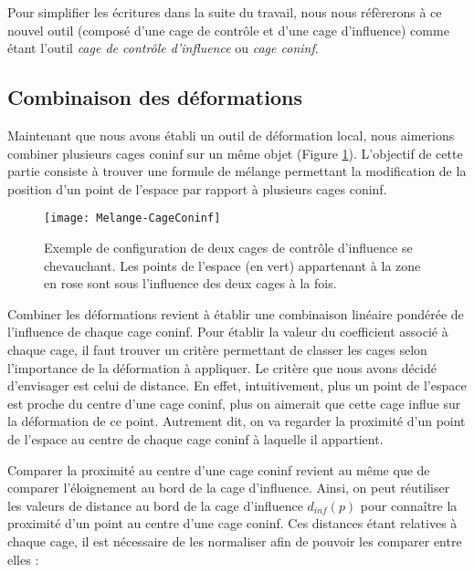 Pour simplifier les écritures dans la suite du travail, nous nous réfèrerons à
ce nouvel outil (composé d'une cage de contrôle et d'une cage d'influence)
comme étant l'outil \textit{cage de contrôle d'influence} ou \textit{cage
coninf}.

\subsection{Combinaison des déformations}

Maintenant que nous avons établi un outil de déformation local, nous aimerions
combiner plusieurs cages coninf sur un même objet (Figure \ref{MELMC}).
L'objectif de cette partie consiste à trouver une formule de mélange
permettant la modification de la position d'un point de l'espace par rapport à
plusieurs cages coninf.

\begin{figure}[ht]
  \begin{center}
    \texttt{[image: Melange-CageConinf]}

    \caption[Mélange de cages de contrôle d'influence] {Exemple de
configuration de deux cages de contrôle d'influence se chevauchant. Les points
de l'espace (en vert) appartenant à la zone en rose sont sous l'influence des
deux cages à la fois.}

    \label{MELMC}
  \end{center}
\end{figure}

Combiner les déformations revient à établir une combinaison linéaire pondérée
de l'influence de chaque cage coninf. Pour établir la valeur du coefficient
associé à chaque cage, il faut trouver un critère permettant de classer les
cages selon l'importance de la déformation à appliquer. Le critère que nous
avons décidé d'envisager est celui de distance. En effet, intuitivement, plus
un point de l'espace est proche du centre d'une cage coninf, plus on aimerait
que cette cage influe sur la déformation de ce point. Autrement dit, on va
regarder la proximité d'un point de l'espace au centre de chaque cage coninf à
laquelle il appartient.

Comparer la proximité au centre d'une cage coninf revient au même que de
comparer l'éloignement au bord de la cage d'influence. Ainsi, on peut
réutiliser les valeurs de distance au bord de la cage d'influence $d_{inf}(p)$
pour connaître la proximité d'un point au centre d'une cage coninf. Ces
distances étant relatives à chaque cage, il est nécessaire de les normaliser
afin de pouvoir les comparer entre elles :

